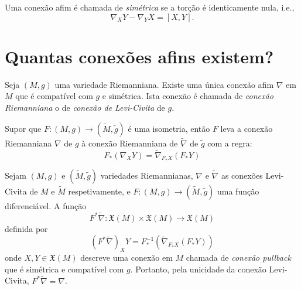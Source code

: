 \begin{definicao}
	Uma conexão afim é chamada de \emph{simétrica} se a torção é identicamente nula, i.e.,
	\begin{equation*}
		\nabla_X Y - \nabla_Y X = [X,Y].
	\end{equation*}
\end{definicao}

\section{Quantas conexões afins existem?}

\begin{teorema}
	Seja $(M,g)$ uma variedade Riemanniana. Existe uma única conexão afim $\nabla$ em $M$ que é compatível com $g$ e simétrica.
	Ista conexão é chamada de \emph{conexão Riemanniana} o de \emph{conexão de Levi-Civita} de $g$.
\end{teorema}



\begin{proposicao}
	Supor que $F: (M,g) \rightarrow (\tilde{M}, \tilde{g})$ é uma isometria, então $F$ leva a conexão Riemanniana $\nabla$ de $g$ à conexão Riemanniana de $\tilde{\nabla}$ de $\tilde{g}$ com a regra:
	\begin{equation*}
		F_* (\nabla_X Y) = \tilde{\nabla}_{F_* X} (F_* Y)
	\end{equation*}
\end{proposicao}

\begin{observacao}
	Sejam $(M,g)$ e $(\tilde{M}, \tilde{g})$ variedades Riemannianas, $\nabla$ e $\tilde{\nabla}$ as conexões Levi-Civita de $M$ e $\tilde{M}$ respetivamente, e $F: (M,g) \rightarrow (\tilde{M},\tilde{g})$ uma função diferenciável. A função
	\begin{equation*}
		F^* \tilde{\nabla}: \mathfrak{X}(M) \times \mathfrak{X}(M) \rightarrow \mathfrak{X}(M)
	\end{equation*}
	definida por
	\begin{equation*}
		\left( F^* \tilde{\nabla} \right)_X Y = F^{-1}_* \left( \tilde{\nabla}_{F_* X} (F_* Y) \right)
	\end{equation*}
	onde $X,Y \in \mathfrak{X}(M)$ descreve uma conexão em $M$ chamada de \emph{conexão pullback} que é simétrica e compatível com $g$. Portanto, pela unicidade da conexão Levi-Civita, $F^* \tilde{\nabla} = \nabla$.
\end{observacao}

